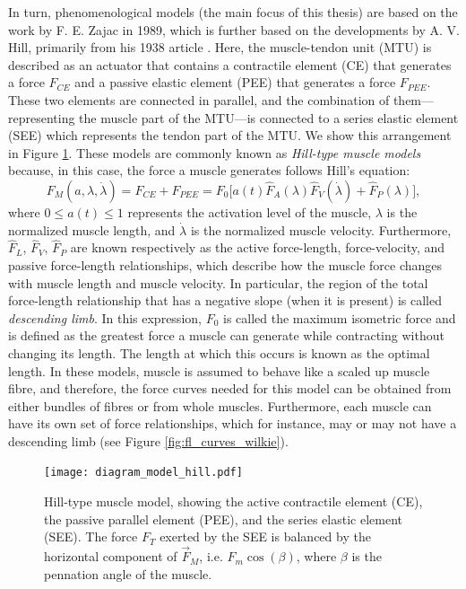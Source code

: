 \documentclass{sfuthesis}
\numberwithin{equation}{section}
\numberwithin{figure}{chapter}
\numberwithin{table}{chapter}
\theoremstyle{definition}
\begin{document}
In turn, phenomenological models (the main focus of this thesis) are based on the work by F. E. Zajac \cite{Zajac1989} in 1989, which is further based on the developments by A. V. Hill, primarily from his 1938 article \cite{Hill1938}. Here, the muscle-tendon unit (MTU) is described as an actuator that contains a contractile element (CE) that generates a force $F_{CE}$ and a passive elastic element (PEE) that generates a force $F_{PEE}$. These two elements are connected in parallel, and the combination of them---representing the muscle part of the MTU---is connected to a series elastic element (SEE) which represents the tendon part of the MTU. We show this arrangement in Figure \ref{fig:diagram_hill}. These models are commonly known as \textit{Hill-type muscle models} because, in this case, the force a muscle generates follows Hill's equation:
\begin{equation} \label{eq:hill_in_intro}
    F_M(a,\lambda,\dot{\lambda}) = F_{CE} + F_{PEE} = F_0  \Big[ a(t) \widehat{F}_A(\lambda) \widehat{F}_V(\dot{\lambda}) + \widehat{F}_P(\lambda) \Big], 
\end{equation}
where $0 \leq a(t) \leq 1$ represents the activation level of the muscle, $\lambda$ is the normalized muscle length, and $\dot{\lambda}$ is the normalized muscle velocity. Furthermore, $\widehat{F}_L$, $\widehat{F}_V$, $\widehat{F}_P$ are known respectively as the active force-length, force-velocity, and passive force-length relationships, which describe how the muscle force changes with muscle length and muscle velocity.
In particular, the region of the total force-length relationship that has a negative slope (when it is present) is called \textit{descending limb}. 
In this expression, $F_0$ is called the maximum isometric force and is defined as the greatest force a muscle can generate while contracting without changing its length. The length at which this occurs is known as the optimal length. In these models, muscle is assumed to behave like a scaled up muscle fibre, and therefore, the force curves needed for this model can be obtained from either bundles of fibres or from whole muscles. Furthermore, each muscle can have its own set of force relationships, which for instance, may or may not have a descending limb (see Figure \ref{fig:fl_curves_wilkie}).


\begin{figure}
    \centering
    \texttt{[image: diagram\_model\_hill.pdf]}
    \caption{Hill-type muscle model, showing the active contractile element (CE), the passive parallel element (PEE), and the series elastic element (SEE). The force $F_T$ exerted by the SEE is balanced by the horizontal component of $\vec{F}_M$, i.e. $F_m \cos(\beta)$, where $\beta$ is the pennation angle of the muscle.\label{fig:diagram_hill}}
\end{figure}
\end{document}
